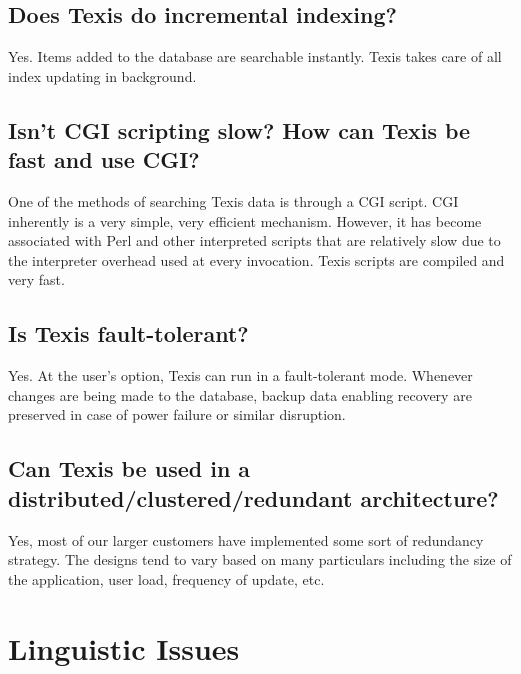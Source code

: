 \section{Does Texis do incremental indexing? }

Yes.  Items added to the database are searchable instantly.  Texis
takes care of all index updating in background.

\section{Isn't CGI scripting slow? How can Texis be fast and use CGI? }

One of the methods of searching Texis data is through a CGI script.
CGI inherently is a very simple, very efficient mechanism.  However,
it has become associated with Perl and other interpreted scripts that
are relatively slow due to the interpreter overhead used at every
invocation.  Texis scripts are compiled and very fast.

\section{Is Texis fault-tolerant? }

Yes. At the user's option, Texis can run in a fault-tolerant mode.
Whenever changes are being made to the database, backup data enabling
recovery are preserved in case of power failure or similar disruption.

\section{Can Texis be used in a distributed/clustered/redundant architecture? }

Yes, most of our larger customers have implemented some sort of
redundancy strategy.  The designs tend to vary based on many
particulars including the size of the application, user load,
frequency of update, etc.

\chapter{Linguistic Issues}


